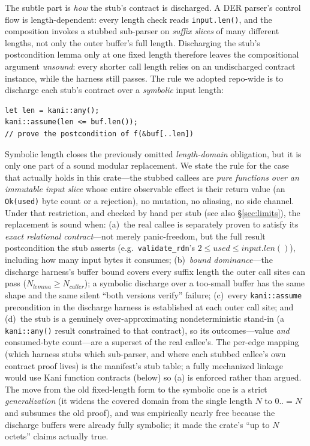 \documentclass[10pt,twocolumn]{article}
\newcommand{\code}[1]{\texttt{\small #1}}
\begin{document}
The subtle part is \emph{how} the stub's contract is discharged. A DER parser's
control flow is length-dependent: every length check reads
\code{input.len()}, and the composition invokes a stubbed sub-parser on
\emph{suffix slices} of many different lengths, not only the outer buffer's
full length. Discharging the stub's postcondition lemma only at one fixed
length therefore leaves the compositional argument \emph{unsound}: every shorter
call length relies on an undischarged contract instance, while the harness still
passes. The rule we adopted repo-wide is to discharge each stub's contract over
a \emph{symbolic} input length:
\begin{lstlisting}
let len = kani::any();
kani::assume(len <= buf.len());
// prove the postcondition of f(&buf[..len])
\end{lstlisting}
Symbolic length closes the previously omitted \emph{length-domain} obligation,
but it is only one part of a sound modular replacement. We state the rule for
the case that actually holds in this crate---the stubbed callees are
\emph{pure functions over an immutable input slice} whose entire observable
effect is their return value (an \code{Ok(used)} byte count or a rejection), no
mutation, no aliasing, no side channel. Under that restriction, and checked by
hand per stub (see also \S\ref{sec:limits}), the replacement is sound when:
(a)~the real callee is separately proven to satisfy its \emph{exact relational
contract}---not merely panic-freedom, but the full result postcondition the stub
asserts (e.g.\ \code{validate\_rdn}'s $2 \le \mathit{used} \le
\mathit{input.len()}$), including how many input bytes it consumes;
(b)~\emph{bound dominance}---the discharge harness's buffer bound covers every
suffix length the outer call sites can pass ($N_\mathit{lemma} \ge
N_\mathit{caller}$); a symbolic discharge over a too-small buffer has the same
shape and the same silent ``both versions verify'' failure; (c)~every
\code{kani::assume} precondition in the discharge harness is established at each
outer call site; and (d)~the stub is a genuinely over-approximating
nondeterministic stand-in (a \code{kani::any()} result constrained to that
contract), so its outcomes---value \emph{and} consumed-byte count---are a
superset of the real callee's. The per-edge mapping (which harness stubs which
sub-parser, and where each stubbed callee's own contract proof lives) is the
manifest's stub table; a fully mechanized linkage would use Kani function
contracts (below) so (a) is enforced rather than argued. The move from the old
fixed-length form to the symbolic one is a strict \emph{generalization} (it
widens the covered domain from the single length $N$ to $0..=N$ and subsumes the
old proof), and was empirically nearly free because the discharge buffers were
already fully symbolic; it made the crate's ``up to $N$ octets'' claims actually
true.
\end{document}
